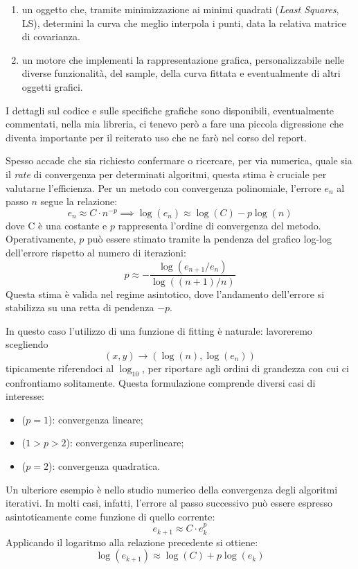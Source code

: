 \documentclass[11pt, a4paper]{article}
\begin{document}
\begin{enumerate}
    \item un oggetto che, tramite minimizzazione ai minimi quadrati (\textit{Least Squares}, LS), determini la curva che meglio interpola i punti, data la relativa matrice di covarianza.
    \item un motore che implementi la rappresentazione grafica, personalizzabile nelle diverse funzionalità, del sample, della curva fittata e eventualmente di altri oggetti grafici.
\end{enumerate}

I dettagli sul codice e sulle specifiche grafiche sono disponibili, eventualmente commentati, nella mia libreria, ci tenevo però a fare una piccola digressione che diventa importante per il reiterato uso che ne farò nel corso del report.
\bigskip

\noindent Spesso accade che sia richiesto confermare o ricercare, per via numerica, quale sia il \textit{rate} di convergenza per determinati algoritmi, questa stima è cruciale per valutarne l'efficienza. Per un metodo con convergenza polinomiale, l'errore $e_n$ al passo $n$ segue la relazione:
\[
    e_n \approx C \cdot n^{-p} \implies \log(e_n) \approx \log(C) - p \log(n)
\]
dove C è una costante e $p$ rappresenta l’ordine di convergenza del metodo. Operativamente, $p$ può essere stimato tramite la pendenza del grafico log-log dell'errore rispetto al numero di iterazioni:
\[
    p \approx -\frac{\log(e_{n+1} / e_n)}{\log((n+1) / n)}
\]
Questa stima è valida nel regime asintotico, dove l'andamento dell'errore si stabilizza su una retta di pendenza $-p$.

\bigskip
\noindent
In questo caso l'utilizzo di una funzione di fitting è naturale: lavoreremo scegliendo 
$$(x, y) \rightarrow (\log(n), \log(e_n))$$ tipicamente riferendoci al $\log_{10}$, per riportare agli ordini di grandezza con cui ci confrontiamo solitamente. 
\noindent Questa formulazione comprende diversi casi di interesse:
\begin{itemize}
\item ($p = 1$): convergenza lineare;
\item ($1 > p > 2$): convergenza superlineare;
\item ($p = 2$): convergenza quadratica.
\end{itemize}

\bigskip
\noindent
Un ulteriore esempio è nello studio numerico della convergenza degli algoritmi iterativi. In molti casi, infatti, l’errore al passo successivo può essere espresso asintoticamente come funzione di quello corrente:
\[
e_{k+1} \approx C \cdot e_k^{p}
\]
Applicando il logaritmo alla relazione precedente si ottiene:
\[
\log(e_{k+1}) \approx \log(C) + p\log(e_k)
\]
\end{document}
